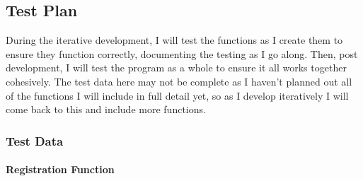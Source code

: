 \documentclass{article}
\begin{document}
\subsection{Test Plan}

During the iterative development, I will test the functions as I create them to ensure they function correctly, documenting the testing as I go along. Then, post development, I will test the program as a whole to ensure it all works together cohesively. The test data here may not be complete as I haven't planned out all of the functions I will include in full detail yet, so as I develop iteratively I will come back to this and include more functions. 

\subsubsection{Test Data}

\paragraph{Registration Function}
\end{document}
